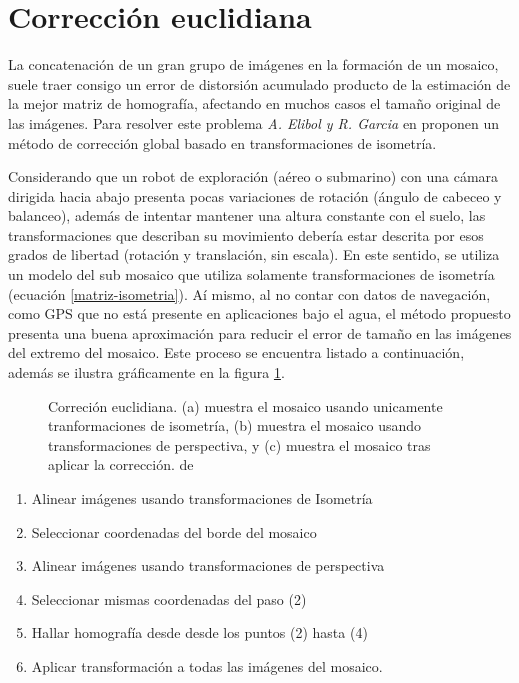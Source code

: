 \section{Corrección euclidiana}\label{seccion-ec}

La concatenación de un gran grupo de imágenes en la formación de un mosaico, suele traer consigo un error de distorsión acumulado producto de la estimación de la mejor matriz de homografía, afectando en muchos casos el tamaño original de las imágenes. Para resolver este problema \textit{A. Elibol y R. Garcia} en \cite{elibol} proponen un método de corrección global basado en transformaciones de isometría.

Considerando que un robot de exploración (aéreo o submarino) con una cámara dirigida hacia abajo presenta pocas variaciones de rotación (ángulo de cabeceo y balanceo), además de intentar mantener una altura constante con el suelo, las transformaciones que describan su movimiento debería estar descrita por esos grados de libertad (rotación y translación, sin escala). En este sentido, se utiliza un modelo del sub mosaico que utiliza solamente transformaciones de isometría (ecuación \ref{matriz-isometria}). Aí mismo, al no contar con datos de navegación, como GPS que no está presente en aplicaciones bajo el agua, el método propuesto presenta una buena aproximación para reducir el error de tamaño en las imágenes del extremo del mosaico. Este proceso se encuentra listado a continuación, además se ilustra gráficamente en la figura \ref{imagen:correcion-e}.
\begin{figure}[h]
	\centering     %
	\hspace{5mm}%
	\caption[Correción euclidiana]{Correción euclidiana. (a) muestra el mosaico usando unicamente tranformaciones de isometría, (b) muestra el mosaico usando transformaciones de perspectiva, y (c) muestra el mosaico tras aplicar la corrección. de \cite{elibol}}
	
	\label{imagen:correcion-e}
\end{figure}
\begin{enumerate}%
	\item Alinear imágenes usando transformaciones de Isometría
	\item Seleccionar coordenadas del borde del mosaico
	\item Alinear imágenes usando transformaciones de perspectiva
	\item Seleccionar mismas coordenadas del paso (2)
	\item Hallar homografía desde desde los puntos (2) hasta (4)
	\item Aplicar transformación a todas las imágenes del mosaico.
\end{enumerate}

